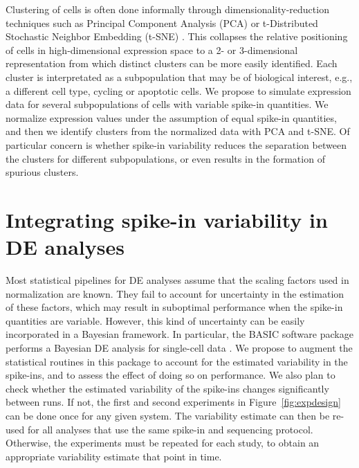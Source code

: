 \documentclass{article}
\begin{document}
Clustering of cells is often done informally through dimensionality-reduction techniques such as Principal Component Analysis (PCA) or t-Distributed Stochastic Neighbor Embedding (t-SNE) \cite{van2008visualizing,julia2015sincell}.
This collapses the relative positioning of cells in high-dimensional expression space to a 2- or 3-dimensional representation from which distinct clusters can be more easily identified. 
Each cluster is interpretated as a subpopulation that may be of biological interest, e.g., a different cell type, cycling or apoptotic cells.
We propose to simulate expression data for several subpopulations of cells with variable spike-in quantities.
We normalize expression values under the assumption of equal spike-in quantities, and then we identify clusters from the normalized data with PCA and t-SNE.
Of particular concern is whether spike-in variability reduces the separation between the clusters for different subpopulations, or even results in the formation of spurious clusters.

\section{Integrating spike-in variability in DE analyses}
Most statistical pipelines for DE analyses assume that the scaling factors used in normalization are known.
They fail to account for uncertainty in the estimation of these factors, which may result in suboptimal performance when the spike-in quantities are variable.
However, this kind of uncertainty can be easily incorporated in a Bayesian framework.
In particular, the BASIC software package performs a Bayesian DE analysis for single-cell data \cite{cata?}.
We propose to augment the statistical routines in this package to account for the estimated variability in the spike-ins, and to assess the effect of doing so on performance.
We also plan to check whether the estimated variability of the spike-ins changes significantly between runs.
If not, the first and second experiments in Figure~\ref{fig:expdesign} can be done once for any given system.
The variability estimate can then be re-used for all analyses that use the same spike-in and sequencing protocol.
Otherwise, the experiments must be repeated for each study, to obtain an appropriate variability estimate that point in time.


\end{document}
